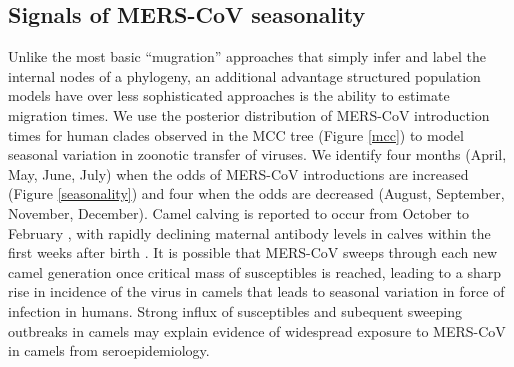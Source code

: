 \documentclass[11pt,oneside,letterpaper]{article}
\begin{document}
\subsection*{Signals of MERS-CoV seasonality}
Unlike the most basic ``mugration'' approaches that simply infer and label the internal nodes of a phylogeny, an additional advantage structured population models have over less sophisticated approaches is the ability to estimate migration times.
We use the posterior distribution of MERS-CoV introduction times for human clades observed in the MCC tree (Figure \ref{mcc}) to model seasonal variation in zoonotic transfer of viruses.
We identify four months (April, May, June, July) when the odds of MERS-CoV introductions are increased (Figure \ref{seasonality}) and four when the odds are decreased (August, September, November, December).
Camel calving is reported to occur from October to February \citep{almutairi_non-genetic_2010}, with rapidly declining maternal antibody levels in calves within the first weeks after birth \citep{wernery_camelid_2001}.
It is possible that MERS-CoV sweeps through each new camel generation once critical mass of susceptibles is reached, leading to a sharp rise in incidence of the virus in camels that leads to seasonal variation in force of infection in humans.
Strong influx of susceptibles and subequent sweeping outbreaks in camels may explain evidence of widespread exposure to MERS-CoV in camels from seroepidemiology.
\end{document}
